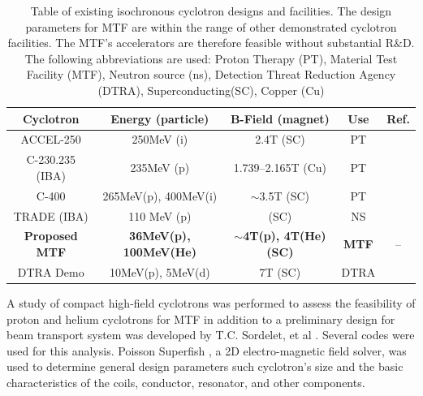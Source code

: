 \documentclass[final,3p,times,twocolumn]{elsarticle} %
\begin{document}
\begin{table}
\begin{tabular}{|c|c|c|c|c|} 
\hline Cyclotron & Energy (particle) & B-Field (magnet) & Use & Ref. \\ 
\hline
\hline ACCEL-250 & 250MeV (i) & 2.4T (SC) & PT & \cite{geisler2007commissioning} \\ 
\hline C-230.235 (IBA) & 235MeV (p) & 1.739--2.165T (Cu) & PT & \cite{huh} \\
\hline C-400 & 265MeV(p), 400MeV(i) & $\sim$3.5T (SC)  & PT & \cite{Jongen201047} \\ 
\hline TRADE (IBA) & 110 MeV (p) & (SC) & NS & \cite{jongen2004new}\\
\hline \textbf{Proposed MTF} & \textbf{36MeV(p), 100MeV(He)} & $\sim$\textbf{4T(p), 4T(He) (SC)} & \textbf{MTF} & -- \\ 
\hline DTRA Demo & 10MeV(p), 5MeV(d) & 7T (SC) & DTRA & \cite{huh} \\ 
\hline %
\end{tabular} 
\caption{Table of existing isochronous cyclotron designs and facilities.  The design parameters for MTF are within the range of other demonstrated cyclotron facilities.  The MTF's accelerators are therefore feasible without substantial R$\&$D.  The following abbreviations are used: Proton Therapy (PT), Material Test Facility (MTF), Neutron source (ns), Detection Threat Reduction Agency (DTRA), Superconducting(SC), Copper (Cu)}
\label{tab:cyclotrons}
\end{table}

A study of compact high-field cyclotrons was performed to assess the feasibility of proton and helium cyclotrons for MTF in addition to a preliminary design for beam transport system was developed by T.C. Sordelet, et al \cite{sordelet2011design}.  Several codes were used for this analysis. Poisson Superfish \cite{superfish1976software}, a 2D electro-magnetic field solver, was used to determine general design parameters such cyclotron's size and the basic characteristics of the coils, conductor, resonator, and other components.  
\end{document}
